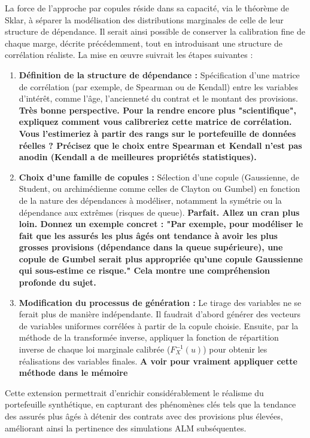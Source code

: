 La force de l'approche par copules réside dans sa capacité, via le théorème de Sklar, à séparer la modélisation des distributions marginales de celle de leur structure de dépendance. Il serait ainsi possible de conserver la calibration fine de chaque marge, décrite précédemment, tout en introduisant une structure de corrélation réaliste. La mise en œuvre suivrait les étapes suivantes :
\begin{enumerate}
    \item \textbf{Définition de la structure de dépendance :} Spécification d'une matrice de corrélation (par exemple, de Spearman ou de Kendall) entre les variables d'intérêt, comme l'âge, l'ancienneté du contrat et le montant des provisions.\textbf{ Très bonne perspective. Pour la rendre encore plus "scientifique", expliquez comment vous calibreriez cette matrice de corrélation. Vous l'estimeriez à partir des rangs sur le portefeuille de données réelles ? Précisez que le choix entre Spearman et Kendall n'est pas anodin (Kendall a de meilleures propriétés statistiques).}
    \item \textbf{Choix d'une famille de copules :} Sélection d'une copule (Gaussienne, de Student, ou archimédienne comme celles de Clayton ou Gumbel) en fonction de la nature des dépendances à modéliser, notamment la symétrie ou la dépendance aux extrêmes (risques de queue).\textbf{ Parfait. Allez un cran plus loin. Donnez un exemple concret : "Par exemple, pour modéliser le fait que les assurés les plus âgés ont tendance à avoir les plus grosses provisions (dépendance dans la queue supérieure), une copule de Gumbel serait plus appropriée qu'une copule Gaussienne qui sous-estime ce risque." Cela montre une compréhension profonde du sujet.}
    \item \textbf{Modification du processus de génération :} Le tirage des variables ne se ferait plus de manière indépendante. Il faudrait d'abord générer des vecteurs de variables uniformes corrélées à partir de la copule choisie. Ensuite, par la méthode de la transformée inverse, appliquer la fonction de répartition inverse de chaque loi marginale calibrée ($F_X^{-1}(u)$) pour obtenir les réalisations des variables finales. \textbf{A voir pour vraiment appliquer cette méthode dans le mémoire}
\end{enumerate}

Cette extension permettrait d'enrichir considérablement le réalisme du portefeuille synthétique, en capturant des phénomènes clés tels que la tendance des assurés plus âgés à détenir des contrats avec des provisions plus élevées, améliorant ainsi la pertinence des simulations ALM subséquentes.
